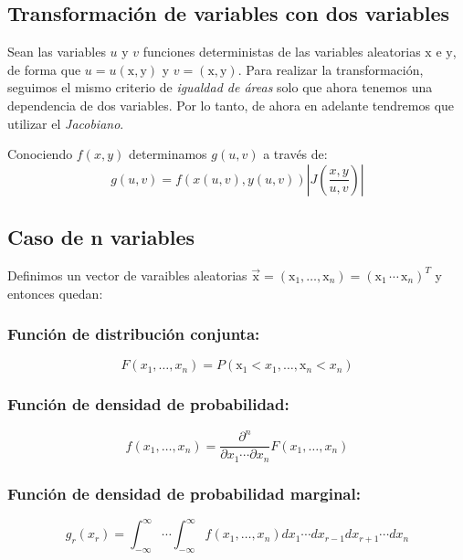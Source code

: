 \documentclass[openany]{book}
\begin{document}
\subsection{Transformación de variables con dos variables}
Sean las variables $u$ y $v$ funciones deterministas de las variables aleatorias $\mathrm{x}$ e $\mathrm{y}$, de forma que $u=u(\mathrm{x,y})$ y $v=(\mathrm{x,y})$. Para realizar la transformación, seguimos el mismo criterio de \emph{igualdad de áreas} solo que ahora tenemos una dependencia de dos variables. Por lo tanto, de ahora en adelante tendremos que utilizar el \emph{Jacobiano}.
\par Conociendo $f(x,y)$ determinamos $g(u,v)$ a través de: \begin{equation}
  \label{eq:trans-dos-variables}
  g(u,v)=f(x(u,v),y(u,v))\left|J\left(\frac{x,y}{u,v}\right)\right|
\end{equation}

\subsection{Caso de n variables}
Definimos un vector de varaibles aleatorias $\vec{\mathrm{x}}=(\mathrm{x}_1,\dots,\mathrm{x}_{n})=(\mathrm{x}_1\,\cdots\,\mathrm{x}_{n})^{T}$ y entonces quedan:

\subsubsection*{Función de distribución conjunta:}
\begin{equation*}
  F(x_1,\dots,x_n)=P(\mathrm{x}_1<x_1,\dots,\mathrm{x}_{n}<x_n)
\end{equation*}
\subsubsection*{Función de densidad de probabilidad:}
\begin{equation*}
  f(x_1,\dots,x_n)=\frac{\partial^n}{\partial x_1\cdots\partial x_{n}}F(x_1,\dots,x_{n})
\end{equation*}
\subsubsection*{Función de densidad de probabilidad marginal:}
\begin{equation*}
  g_{r}(x_{r})=\int_{-\infty}^{\infty}\cdots \int_{-\infty}^{\infty}f(x_1,\dots,x_n)dx_{1}\cdots dx_{r-1}dx_{r+1}\cdots dx_{n}
\end{equation*}
\end{document}
